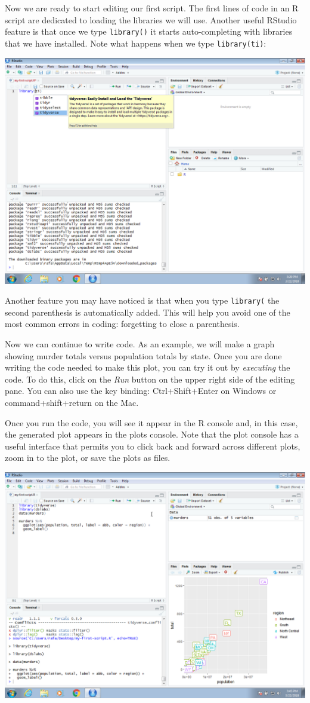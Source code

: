 \documentclass[
]{krantz}
\begin{document}
Now we are ready to start editing our first script. The first lines of code in an R script are dedicated to loading the libraries we will use. Another useful RStudio feature is that once we type \texttt{library()} it starts auto-completing with libraries that we have installed. Note what happens when we type \texttt{library(ti)}:

\begin{center}\includegraphics[width=0.7\linewidth]{productivity/img/windows-screenshots/VirtualBox_Windows-7-Enterprise_22_03_2018_16_29_47} \end{center}

Another feature you may have noticed is that when you type \texttt{library(} the second parenthesis is automatically added. This will help you avoid one of the most common errors in coding: forgetting to close a parenthesis.

Now we can continue to write code. As an example, we will make a graph showing murder totals versus population totals by state. Once you are done writing the code needed to make this plot, you can try it out by \emph{executing} the code. To do this, click on the \emph{Run} button on the upper right side of the editing pane. You can also use the key binding: Ctrl+Shift+Enter on Windows or command+shift+return on the Mac.

Once you run the code, you will see it appear in the R console and, in this case, the generated plot appears in the plots console. Note that the plot console has a useful interface that permits you to click back and forward across different plots, zoom in to the plot, or save the plots as files.

\begin{center}\includegraphics[width=0.7\linewidth]{productivity/img/windows-screenshots/VirtualBox_Windows-7-Enterprise_22_03_2018_16_45_18} \end{center}
\end{document}
